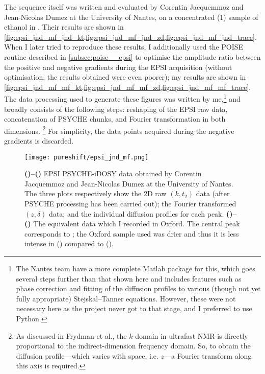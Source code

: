 The sequence itself was written and evaluated by Corentin Jacquemmoz and Jean-Nicolas Dumez at the University of Nantes, on a concentrated (\SI{1}{\molar}) sample of ethanol in .
Their results are shown in \cref{fig:epsi_jnd_mf_jnd_kt,fig:epsi_jnd_mf_jnd_zd,fig:epsi_jnd_mf_jnd_trace}.
When I later tried to reproduce these results, I additionally used the POISE routine described in \cref{subsec:poise__epsi} to optimise the amplitude ratio between the positive and negative gradients during the EPSI acquisition (without optimisation, the results obtained were even poorer); my results are shown in \cref{fig:epsi_jnd_mf_mf_kt,fig:epsi_jnd_mf_mf_zd,fig:epsi_jnd_mf_mf_trace}.
The data processing used to generate these figures was written by me,\footnote{The Nantes team have a more complete Matlab package for this, which goes several steps further than that shown here and includes features such as phase correction and fitting of the diffusion profiles to various (though not yet fully appropriate) Stejskal--Tanner equations. However, these were not necessary here as the project never got to that stage, and I preferred to use Python.} and broadly consists of the following steps: reshaping of the EPSI raw data, concatenation of PSYCHE chunks, and Fourier transformation in both dimensions.%
\footnote{As discussed in Frydman et al.\autocite{Frydman2003JACS}, the $k$-domain in ultrafast NMR is directly proportional to the indirect-dimension frequency domain. So, to obtain the diffusion profile---which varies with space, i.e. $z$---a Fourier transform along this axis is required.}
For simplicity, the data points acquired during the negative gradients is discarded.

\begin{figure}[htbp]
    \centering
    \texttt{[image: pureshift/epsi\_jnd\_mf.png]}%
    {\label{fig:epsi_jnd_mf_jnd_kt}}%
    {\label{fig:epsi_jnd_mf_jnd_zd}}%
    {\label{fig:epsi_jnd_mf_jnd_trace}}%
    {\label{fig:epsi_jnd_mf_mf_kt}}%
    {\label{fig:epsi_jnd_mf_mf_zd}}%
    {\label{fig:epsi_jnd_mf_mf_trace}}%
    \caption[Comparison of EPSI PSYCHE-iDOSY data acquired in Nantes and Oxford]{
        \textbf{()--()} EPSI PSYCHE-iDOSY data obtained by Corentin Jacquemmoz and Jean-Nicolas Dumez at the University of Nantes.
        The three plots respectively show the 2D raw $(k, t_2)$ data (after PSYCHE processing has been carried out); the Fourier transformed $(z, \delta)$ data; and the individual diffusion profiles for each peak.
        \textbf{()--()} The equivalent data which I recorded in Oxford.
        The central peak corresponds to ; the Oxford sample used was drier and thus it is less intense in () compared to ().
    }
    \label{fig:epsi_jnd_mf}
\end{figure}

